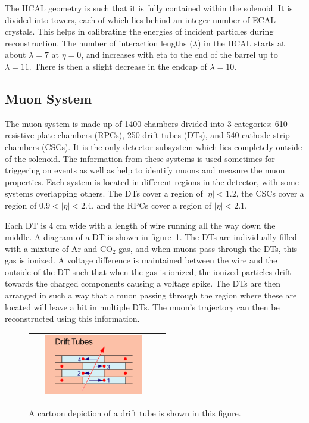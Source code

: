 The HCAL geometry is such that it is fully contained within the solenoid.
It is divided into towers, each of which lies behind an integer number of ECAL crystals.
This helps in calibrating the energies of incident particles during reconstruction.
The number of interaction lengths ($\lambda$) in the HCAL starts at about $\lambda = 7$ at $\eta = 0$, and increases with eta to the end of the barrel up to $\lambda = 11$.
There is then a slight decrease in the endcap of $\lambda = 10$.

\subsection{Muon System}
\label {subs:MUON}
The muon system is made up of 1400 chambers divided into 3 categories: 610 resistive plate chambers (RPCs), 250 drift tubes (DTs), and 540 cathode strip chambers (CSCs).
It is the only detector subsystem which lies completely outside of the solenoid.
The information from these systems is used sometimes for triggering on events as well as help to identify muons and measure the muon properties.
Each system is located in different regions in the detector, with some systems overlapping others.
The DTs cover a region of $|\eta| < 1.2$, the CSCs cover a region of $0.9 < |\eta| < 2.4$, and the RPCs cover a region of $|\eta| < 2.1$.

Each DT is 4 cm wide with a length of wire running all the way down the middle.
A diagram of a DT is shown in figure~\ref{fig:DT}.
The DTs are individually filled with a mixture of Ar and $\mathrm{CO_{2}}$ gas, and when muons pass through the DTs, this gas is ionized.
A voltage difference is maintained between the wire and the outside of the DT such that when the gas is ionized,
the ionized particles drift towards the charged components causing a voltage spike.
The DTs are then arranged in such a way that a muon passing through the region where these are located will leave a hit in multiple DTs.
The muon's trajectory can then be reconstructed using this information.

\begin{figure}[!ht]
\begin{center}
\begin{tabular}{cc}
\includegraphics[width=0.8\textwidth]{cms/figs/DT.png}
\end{tabular}
\caption{ A cartoon depiction of a drift tube is shown in this figure. 
\label{fig:DT}
}
\end{center}
\end{figure}

